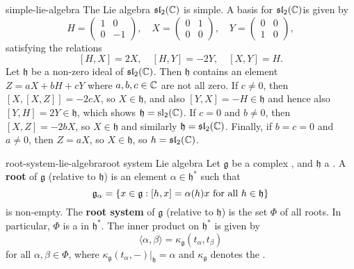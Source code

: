 \begin{example}{simple-lie-algebra}
    The Lie algebra $\mathfrak{sl}_2(\mathbb{C})$ is simple. A basis for $\mathfrak{sl}_2(\mathbb{C})$is given by
    \[ H = \begin{pmatrix} 1 & 0 \\ 0 & -1 \end{pmatrix}, \quad X = \begin{pmatrix} 0 & 1 \\ 0 & 0 \end{pmatrix}, \quad Y = \begin{pmatrix} 0 & 0 \\ 1 & 0 \end{pmatrix} , \]
    satisfying the relations
    \[ [H, X] = 2X, \quad [H, Y] = -2Y, \quad [X, Y] = H . \]
    Let $\mathfrak{h}$ be a non-zero ideal of $\mathfrak{sl}_2(\mathbb{C})$. Then $\mathfrak{h}$ contains an element $Z = aX + bH + cY$ where $a, b, c \in \mathbb{C}$ are not all zero. If $c \ne 0$, then $[X, [X, Z]] = -2cX$, so $X \in \mathfrak{h}$, and also $[Y, X] = -H \in \mathfrak{h}$ and hence also $[Y, H] = 2Y \in \mathfrak{h}$, which shows $\mathfrak{h} = \textup{sl}_2(\mathbb{C})$. If $c = 0$ and $b \ne 0$, then $[X, Z] = -2bX$, so $X \in \mathfrak{h}$ and similarly $\mathfrak{h} = \mathfrak{sl}_2(\mathbb{C})$. Finally, if $b = c = 0$ and $a \ne 0$, then $Z = aX$, so $X \in \mathfrak{h}$, so $h = \mathfrak{sl}_2(\mathbb{C})$.
\end{example}

\begin{topic}{root-system-lie-algebra}{root system Lie algebra}
    Let $\mathfrak{g}$ be a complex  , and $\mathfrak{h}$ a . A \textbf{root} of $\mathfrak{g}$ (relative to $\mathfrak{h}$) is an element $\alpha \in \mathfrak{h}^*$ such that
    \[ \mathfrak{g}_\alpha = \{ x \in \mathfrak{g} : [h, x] = \alpha(h) x \textup{ for all } h \in \mathfrak{h} \} \]
    is non-empty. The \textbf{root system} of $\mathfrak{g}$ (relative to $\mathfrak{h}$) is the set $\Phi$ of all roots. In particular, $\Phi$ is a  in $\mathfrak{h}^*$. The inner product on $\mathfrak{h}^*$ is given by
    \[ \langle \alpha, \beta \rangle = \kappa_\mathfrak{g}(t_\alpha, t_\beta) \]
    for all $\alpha, \beta \in \Phi$, where $\kappa_\mathfrak{g}(t_\alpha, -)|_\mathfrak{h} = \alpha$ and $\kappa_\mathfrak{g}$ denotes the .
\end{topic}


